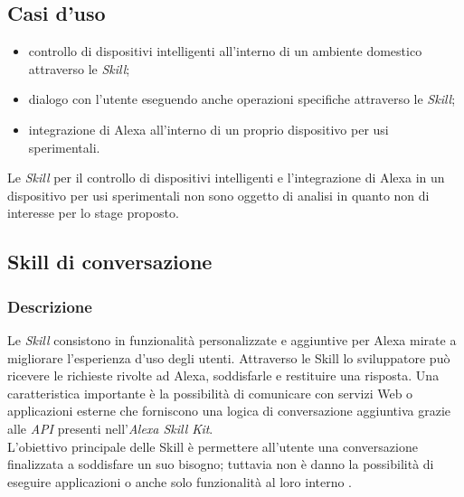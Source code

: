 	\subsection{Casi d'uso}
	\begin{itemize}
		\item controllo di dispositivi intelligenti all'interno di un ambiente domestico attraverso le \textit{Skill};
		\item dialogo con l'utente eseguendo anche operazioni specifiche attraverso le \textit{Skill};
		\item integrazione di Alexa all'interno di un proprio dispositivo per usi sperimentali.
	\end{itemize}
	Le \textit{Skill} per il controllo di dispositivi intelligenti e l'integrazione di Alexa in un dispositivo per usi sperimentali non sono oggetto di analisi in quanto non di interesse per lo stage proposto.
	\subsection{Skill di conversazione}
		\subsubsection{Descrizione}
		Le \textit{Skill} consistono in funzionalità personalizzate e aggiuntive per Alexa mirate a migliorare l'esperienza d'uso degli utenti. Attraverso le Skill lo sviluppatore può ricevere le richieste rivolte ad Alexa, soddisfarle e restituire una risposta. Una caratteristica importante è la possibilità di comunicare con servizi Web o applicazioni esterne che forniscono una logica di conversazione aggiuntiva grazie alle \textit{API} presenti nell'\textit{Alexa Skill Kit}. \\
		L'obiettivo principale delle Skill è permettere all'utente una conversazione finalizzata a soddisfare un suo bisogno; tuttavia non è danno la possibilità di eseguire applicazioni o anche solo funzionalità al loro interno .
